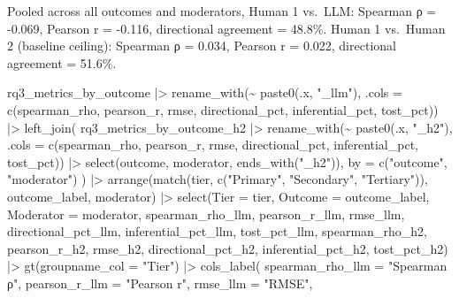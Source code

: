 \documentclass[
  letterpaper,
  DIV=11,
  numbers=noendperiod]{scrartcl}
\newenvironment{Shaded}{\begin{snugshade}}{\end{snugshade}}
\newcommand{\AttributeTok}[1]{\textcolor[rgb]{0.40,0.45,0.13}{#1}}
\newcommand{\FunctionTok}[1]{\textcolor[rgb]{0.28,0.35,0.67}{#1}}
\newcommand{\NormalTok}[1]{\textcolor[rgb]{0.00,0.23,0.31}{#1}}
\newcommand{\SpecialCharTok}[1]{\textcolor[rgb]{0.37,0.37,0.37}{#1}}
\newcommand{\StringTok}[1]{\textcolor[rgb]{0.13,0.47,0.30}{#1}}
\begin{document}
Pooled across all outcomes and moderators, Human 1 vs.~LLM: Spearman ρ =
-0.069, Pearson r = -0.116, directional agreement = 48.8\%. Human 1
vs.~Human 2 (baseline ceiling): Spearman ρ = 0.034, Pearson r = 0.022,
directional agreement = 51.6\%.

\begin{Shaded}
\begin{Highlighting}[]
\NormalTok{rq3\_metrics\_by\_outcome }\SpecialCharTok{|\textgreater{}}
  \FunctionTok{rename\_with}\NormalTok{(}\SpecialCharTok{\textasciitilde{}} \FunctionTok{paste0}\NormalTok{(.x, }\StringTok{"\_llm"}\NormalTok{),}
              \AttributeTok{.cols =} \FunctionTok{c}\NormalTok{(spearman\_rho, pearson\_r, rmse,}
\NormalTok{                        directional\_pct, inferential\_pct, tost\_pct)) }\SpecialCharTok{|\textgreater{}}
  \FunctionTok{left\_join}\NormalTok{(}
\NormalTok{    rq3\_metrics\_by\_outcome\_h2 }\SpecialCharTok{|\textgreater{}}
      \FunctionTok{rename\_with}\NormalTok{(}\SpecialCharTok{\textasciitilde{}} \FunctionTok{paste0}\NormalTok{(.x, }\StringTok{"\_h2"}\NormalTok{),}
                  \AttributeTok{.cols =} \FunctionTok{c}\NormalTok{(spearman\_rho, pearson\_r, rmse,}
\NormalTok{                             directional\_pct, inferential\_pct, tost\_pct)) }\SpecialCharTok{|\textgreater{}}
      \FunctionTok{select}\NormalTok{(outcome, moderator, }\FunctionTok{ends\_with}\NormalTok{(}\StringTok{"\_h2"}\NormalTok{)),}
    \AttributeTok{by =} \FunctionTok{c}\NormalTok{(}\StringTok{"outcome"}\NormalTok{, }\StringTok{"moderator"}\NormalTok{)}
\NormalTok{  ) }\SpecialCharTok{|\textgreater{}}
  \FunctionTok{arrange}\NormalTok{(}\FunctionTok{match}\NormalTok{(tier, }\FunctionTok{c}\NormalTok{(}\StringTok{"Primary"}\NormalTok{, }\StringTok{"Secondary"}\NormalTok{, }\StringTok{"Tertiary"}\NormalTok{)), outcome\_label, moderator) }\SpecialCharTok{|\textgreater{}}
  \FunctionTok{select}\NormalTok{(}\AttributeTok{Tier =}\NormalTok{ tier, }\AttributeTok{Outcome =}\NormalTok{ outcome\_label, }\AttributeTok{Moderator =}\NormalTok{ moderator,}
\NormalTok{         spearman\_rho\_llm, pearson\_r\_llm, rmse\_llm,}
\NormalTok{         directional\_pct\_llm, inferential\_pct\_llm, tost\_pct\_llm,}
\NormalTok{         spearman\_rho\_h2, pearson\_r\_h2, rmse\_h2,}
\NormalTok{         directional\_pct\_h2, inferential\_pct\_h2, tost\_pct\_h2) }\SpecialCharTok{|\textgreater{}}
  \FunctionTok{gt}\NormalTok{(}\AttributeTok{groupname\_col =} \StringTok{"Tier"}\NormalTok{) }\SpecialCharTok{|\textgreater{}}
  \FunctionTok{cols\_label}\NormalTok{(}
    \AttributeTok{spearman\_rho\_llm    =} \StringTok{"Spearman ρ"}\NormalTok{, }\AttributeTok{pearson\_r\_llm    =} \StringTok{"Pearson r"}\NormalTok{, }\AttributeTok{rmse\_llm    =} \StringTok{"RMSE"}\NormalTok{,}

\end{Highlighting}
\end{Shaded}
\end{document}
